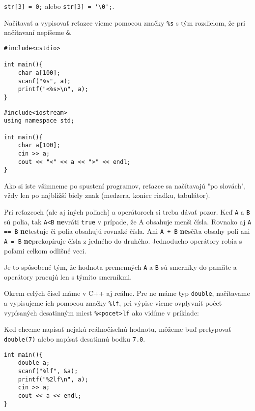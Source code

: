\riesenie \verb!str[3] = 0;! alebo \verb!str[3] = '\0';!.

\medskip

Načítavať a vypisovať reťazce vieme pomocou značky \verb!%s! s tým rozdielom,
že pri načítavaní nepíšeme \verb!&!.

\begin{lstlisting}
#include<cstdio>

int main(){
    char a[100];
    scanf("%s", a);
    printf("<%s>\n", a);
}
\end{lstlisting}
\begin{lstlisting}
#include<iostream>
using namespace std;

int main(){
    char a[100];
    cin >> a;
    cout << "<" << a << ">" << endl;
}
\end{lstlisting}

Ako si iste všimneme po spustení programov, reťazce sa načítavajú "po slovách",
vždy len po najbližší biely znak (medzera, koniec riadku, tabulátor).

\medskip

Pri reťazcoch (ale aj iných poliach) a operátoroch si treba dávať pozor.  Keď
\verb!A! a \verb!B! sú polia, tak \verb!A<B! \textbf{ne}vráti \verb!true! v
prípade, že A obsahuje menši čísla. Rovnako aj \verb!A == B! \textbf{ne}testuje
či polia obsahujú rovnaké čísla. Ani \verb!A + B! \textbf{ne}sčíta obsahy polí
ani \verb!A = B!  \textbf{ne}prekopíruje čísla z jedného do druhého. Jednoducho
operátory robia s poľami celkom odlišné veci.

Je to spôsobené tým, že hodnota premenných \verb!A! a \verb!B! sú smerníky do
pamäte a operátory pracujú len s týmito smerníkmi.


Okrem celých čísel máme v C++ aj reálne. Pre ne máme typ
\verb!double!, načítavame a vypisujeme ich pomocou značky \verb"%lf",
pri výpise vieme ovplyvniť počet vypísaných desatinným miest \verb"%<pocet>lf"
ako vidíme v príklade:

Keď chceme napísať nejakú reálnočíselnú hodnotu, môžeme buď pretypovať
\verb!double(7)! alebo napísať desatinnú bodku \verb!7.0!.

\begin{lstlisting}
int main(){
    double a;
    scanf("%lf", &a);
    printf("%2lf\n", a);
    cin >> a;
    cout << a << endl;
}
\end{lstlisting}

\medskip


